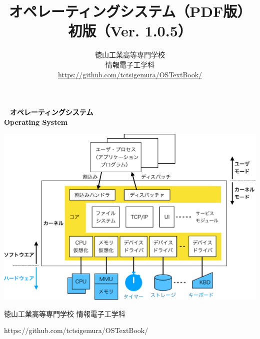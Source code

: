 \documentclass[a4paper,11pt,twocolumn]{ltjsbook}     %
\newif\ifPDF
\newcommand{\pdf}{（PDF版）}
\newcommand{\pdf}{}
\newcommand{\edition}{初版}
\newcommand{\ver}{Ver. 1.0.5}
\begin{document}
\setcounter{page}{0}
\thispagestyle{empty}
\onecolumn
~
\vfill
\vfill
{\noindent
\fontsize{34pt}{50pt}\selectfont\textbf{オペレーティングシステム}\\
\fontsize{34pt}{50pt}\selectfont\textbf{Operating System}
}
\vfill
\vfill
\centerline{
  \includegraphics[scale=0.77]{Fig/osOrganization-crop.pdf}
}
\vfill
\vfill
\centerline{\Large 徳山工業高等専門学校 情報電子工学科}
\centerline{\Large\ttfamily https://github.com/tctsigemura/OSTextBook/}
\vfill

\ifPDF
\newpage
\setcounter{page}{0}
\thispagestyle{empty}
\onecolumn
~
\fi

\frontmatter
\title{オペレーティングシステム{\pdf}\\{\edition}（{\ver}）}
\author{徳山工業高等専門学校\\情報電子工学科\\
\url{https://github.com/tctsigemura/OSTextBook/}}
\date{}
\maketitle
\end{document}
